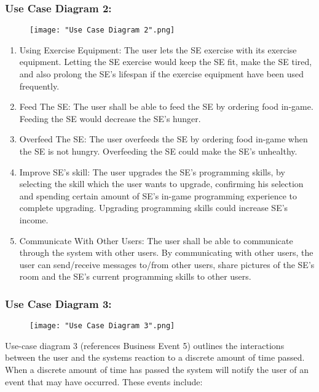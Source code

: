 \documentclass[]{article}
\begin{document}
\subsubsection*{Use Case Diagram 2:}
\begin{figure}[H]
    \centering
    \texttt{[image: "Use Case Diagram 2".png]}
\end{figure}

\begin{enumerate}
    \item Using Exercise Equipment: The user lets the SE exercise with 
    its exercise equipment. Letting the SE exercise would keep the SE fit, make 
    the SE tired, and also prolong the SE’s lifespan if the exercise equipment 
    have been used frequently.
    \item Feed The SE: The user shall be able to feed the SE by ordering food 
    in-game. Feeding the SE would decrease the SE’s hunger. 
    \item Overfeed The SE: The user overfeeds the SE by ordering food in-game 
    when the SE is not hungry. Overfeeding the SE could make the SE’s unhealthy.
    \item Improve SE’s skill: The user upgrades the SE’s programming skills, 
    by selecting the skill which the user wants to upgrade, confirming his 
    selection and spending certain amount of SE’s in-game programming experience 
    to complete upgrading. Upgrading programming skills could increase SE’s income.
    \item Communicate With Other Users: The user shall be able to communicate 
    through the system with other users. By communicating with other users, the 
    user can send/receive messages to/from other users, share pictures of the 
    SE’s room and the SE’s current programming skills to other users.
\end{enumerate}

\subsubsection*{Use Case Diagram 3:}
\begin{figure}[H]
    \centering
    \texttt{[image: "Use Case Diagram 3".png]}
\end{figure}

Use-case diagram 3 (references Business Event 5) outlines the interactions 
between the user and the systems reaction to a discrete amount of time passed. 
When a discrete amount of time has passed the system will notify the user of an 
event that may have occurred. These events include:
\end{document}
